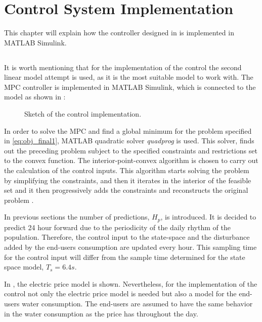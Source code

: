 \chapter{Control System Implementation}
\label{implementation_of_controller}

This chapter will explain how the controller designed in  is implemented in MATLAB Simulink.  

\section{}
It is worth mentioning that for the implementation of the control the second linear model attempt is used, as it is the most suitable model to work with. The MPC controller is implemented in MATLAB Simulink, which is connected to the model as shown in :

\begin{figure}[H]
\centering
 
\caption{Sketch of the control implementation.}
\label{fig:control_sketch}
\end{figure}

In order to solve the MPC and find a global minimum for the problem specified in \eqref{eq:obj_final1},  MATLAB quadratic solver \textit{quadprog} is used. This solver, finds out the preceding problem subject to the specified constraints and restrictions set to the convex function. The interior-point-convex algorithm is chosen to carry out the calculation of the control inputs. This algorithm starts solving the problem by simplifying the constraints, and then it iterates in the interior of the feasible set and it then progressively adds the constraints and reconstructs the original problem \cite{Convex_optimization}. 


In previous sections the number of predictions, $H_p$, is introduced. It is decided to predict 24 hour forward due to the periodicity of the daily rhythm of the population. Therefore, the control input to the state-space and the disturbance added by the end-users consumption are updated every hour. This sampling time for the control input will differ from the sample time determined for the state space model, $T_s = 6.4s$. 

In , the electric price model is shown. Nevertheless, for the implementation of the control not only the electric price model is needed but also a model for the end-users water consumption. The end-users are assumed to have the same behavior in the water consumption as the price has throughout the day.

